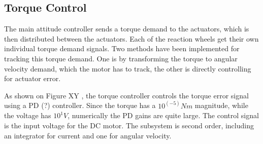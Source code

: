 \subsection{Torque Control}

The main attitude controller sends a torque demand to the actuators, which is then distributed between the actuators. Each of the reaction wheels get their own individual torque demand signals. Two methods have been implemented for tracking this torque demand. One is by transforming the torque to angular velocity demand, which the motor has to track, the other is directly controlling for actuator error.

As shown on Figure XY , the torque controller controls the torque error signal using a PD (?) controller. Since the torque has a $ 10^(-5) Nm$ magnitude, while the voltage has $ 10^1 V$, numerically the PD gains are quite large. The control signal is the input voltage for the DC motor. The subsystem is second order, including an integrator for current and one for angular velocity.
